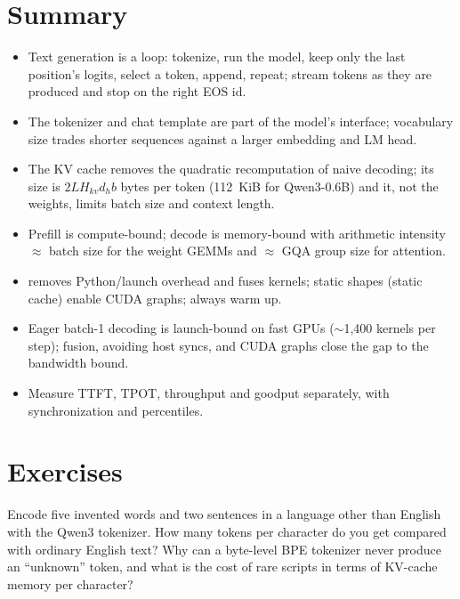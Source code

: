 \section{Summary}\label{sec:inference:summary}
\begin{itemize}
  \item Text generation is a loop: tokenize, run the model, keep only the last position's logits,
    select a token, append, repeat; stream tokens as they are produced and stop on the right EOS id.
  \item The tokenizer and chat template are part of the model's interface; vocabulary size trades
    shorter sequences against a larger embedding and LM head.
  \item The KV cache removes the quadratic recomputation of naive decoding; its size is
    $2LH_{kv}d_hb$ bytes per token (\SI{112}{KiB} for Qwen3-0.6B) and it, not the weights, limits batch
    size and context length.
  \item Prefill is compute-bound; decode is memory-bound with arithmetic intensity $\approx$ batch size
    for the weight GEMMs and $\approx$ GQA group size for attention.
  \item {} removes Python/launch overhead and fuses kernels; static shapes (static
    cache) enable CUDA graphs; always warm up.
  \item Eager batch-1 decoding is launch-bound on fast GPUs ($\sim$1,400 kernels per step); fusion,
    avoiding host syncs, and CUDA graphs close the gap to the bandwidth bound.
  \item Measure TTFT, TPOT, throughput and goodput separately, with synchronization and percentiles.
\end{itemize}

\section{Exercises}\label{sec:inference:exercises}

\begin{exercise}\label{ex:inference:unknown}
Encode five invented words and two sentences in a language other than English with the Qwen3
tokenizer. How many tokens per character do you get compared with ordinary English text? Why can
a byte-level BPE tokenizer never produce an ``unknown'' token, and what is the cost of rare
scripts in terms of KV-cache memory per character?
\end{exercise}

